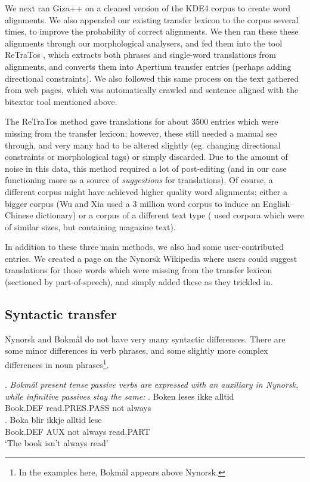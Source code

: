 \documentclass[11pt]{article}
\begin{document}
We next ran Giza++ \citep{och2003scv} on a cleaned version of the KDE4
corpus to create word alignments. We also appended our existing
transfer lexicon to the corpus several times, to improve the
probability of correct alignments. We then ran these these alignments
through our morphological analysers, and fed them into the tool
ReTraTos \citep{caseli2006aib}, which extracts both phrases and
single-word translations from alignments, and converts them into
Apertium transfer entries (perhaps adding directional constraints). We
also followed this same process on the text gathered from web pages,
which was automatically crawled and sentence aligned with the bitextor
tool mentioned above.

The ReTraTos method gave translations for about 3500 entries which
were missing from the transfer lexicon; however, these still needed a
manual see through, and very many had to be altered slightly (eg.
changing directional constraints or morphological tags) or simply
discarded. Due to the amount of noise in this data, this method
required a lot of post-editing (and in our case functioning more as a
source of \emph{suggestions} for translations). Of course, a different
corpus might have achieved higher quality word alignments; either a
bigger corpus (Wu and Xia \citep[1994, in][p.~230]{caseli2006aib} used
a 3 million word corpus to induce an English–Chinese dictionary) or a
corpus of a different text type (\citet{caseli2006aib} used corpora
which were of similar sizes, but containing magazine text).

In addition to these three main methods, we also had some
user-contributed entries. We created a page on the Nynorsk Wikipedia
where users could suggest translations for those words which were
missing from the transfer lexicon (sectioned by part-of-speech), and
simply added these as they trickled in.


\subsection{Syntactic transfer}

Nynorsk and Bokmål do not have very many syntactic differences. There
are some minor differences in verb phrases, and some slightly more
complex differences in noun phrases\footnote{In the examples here,
  Bokmål appears above Nynorsk.}.

\setlength{\Exlabelsep}{1.1em} %
\alignSubExtrue %
\ex. \emph{Bokmål present tense passive verbs are expressed with an
auxiliary in Nynorsk, while infinitive passives stay the same:}
\ag. Boken leses ikke alltid \\
Book.DEF read.PRES.PASS not always \\
\bg. Boka blir ikkje alltid lese\\
Book.DEF AUX not always read.PART \\
`The book isn't always read'
\end{document}
